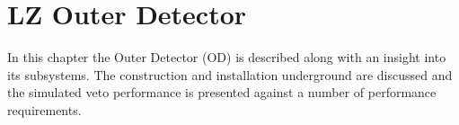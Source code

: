 \chapter{LZ Outer Detector}
\label{chapter:lz_outer_detector}
\par
In this chapter the Outer Detector (OD) is described along with an insight into its subsystems.
The construction and installation underground are discussed and the simulated veto performance is presented against a number of performance requirements.







